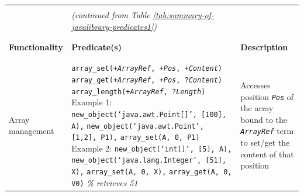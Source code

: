 \begin{table}
    \begin{center}{\scriptsize
    \begin{tabular}{p{2.3cm}p{6.6cm}p{4.6cm}}\hline\hline
    \\
    {~} &
    \textit{(continued from Table \ref{tab:summary-of-javalibrary-predicates1})} &
    {~}\\\\\hline\\
    {\small \textbf{Functionality}} &
    {\small \textbf{Predicate(s)}} &
    {\small \textbf{Description}}
    \\\\\hline\\
    Array\newline
    management
    &
    \texttt{array\_set(+\textit{ArrayRef}, +\textit{Pos}, +\textit{Content})}\newline
    \texttt{array\_get(+\textit{ArrayRef}, +\textit{Pos}, ?\textit{Content})}\newline
    \texttt{array\_length(+\textit{ArrayRef}, ?\textit{Length})}\newline
    Example 1:\newline
    \texttt{new\_object(`java.awt.Point[]', [100], A),}\newline
    \texttt{new\_object(`java.awt.Point', [1,2], P1),}\newline
    \texttt{array\_set(A, 0, P1)}\newline
    Example 2:\newline
    \texttt{new\_object(`int[]', [5], A),}\newline
    \texttt{new\_object(`java.lang.Integer', [51], X),}\newline
	\texttt{array\_set(A, 0, X),}\newline
	\texttt{array\_get(A, 0, V0)} \textit{\% retrieves 51}
    &
    Accesses position \texttt{\textit{Pos}} of the array bound to the
    \texttt{\textit{ArrayRef}} term to set/get the content of that position

\end{tabular}}
\end{center}
\end{table}
